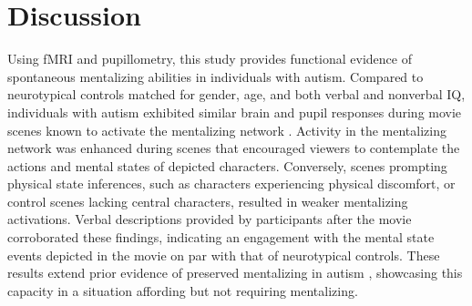 

\vspace*{.1cm}



\section{Discussion}
Using fMRI and pupillometry, this study provides functional evidence of spontaneous mentalizing abilities in individuals with autism. Compared to neurotypical controls matched for gender, age, and both verbal and nonverbal IQ, individuals with autism exhibited similar brain and pupil responses during movie scenes known to activate the mentalizing network \citep{jacoby2016,richardson2018}. Activity in the mentalizing network was enhanced during scenes that encouraged viewers to contemplate the actions and mental states of depicted characters. Conversely, scenes prompting physical state inferences, such as characters experiencing physical discomfort, or control scenes lacking central characters, resulted in weaker mentalizing activations. Verbal descriptions provided by participants after the movie corroborated these findings, indicating an engagement with the mental state events depicted in the movie on par with that of neurotypical controls. These results extend prior evidence of preserved mentalizing in autism \citep{moessnang2020,dufour2013}, showcasing this capacity in a situation affording but not requiring mentalizing.

